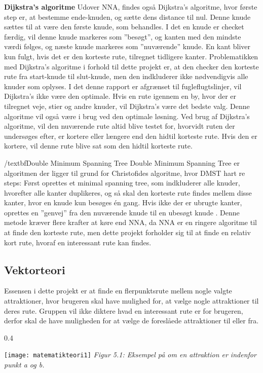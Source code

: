 \textbf{Dijkstra's algoritme}\newline
Udover NNA, findes også Dijkstra’s algoritme, hvor første step er, at bestemme ende-knuden, og sætte dens distance til nul. Denne knude sættes til at være den første knude, som behandles. I det en knude er checket færdig, vil denne knude markeres som ”besøgt”, og kanten med den mindste værdi følges, og næste knude markeres som ”nuværende” knude. En kant bliver kun fulgt, hvis det er den korteste rute, tilregnet tidligere kanter.
Problematikken med Dijkstra’s algoritme i forhold til dette projekt er, at den checker den korteste rute fra start-knude til slut-knude, men den indkluderer ikke nødvendigvis alle knuder som oplyses. I det denne rapport er afgrænset til fugleflugtslinjer, vil Dijkstra’s ikke være den optimale. Hvis en rute igennem en by, hvor der er tilregnet veje, stier og andre knuder, vil Dijkstra’s være det bedste valg. Denne algoritme vil også være i brug ved den optimale løsning. Ved brug af Dijkstra’s algoritme, vil den nuværende rute altid blive testet for, hvorvidt ruten der undersøges efter, er kortere eller længere end den hidtil korteste rute. Hvis den er kortere, vil denne rute blive sat som den hidtil korteste rute. \citep{Dijkstra}

/textbf{Double Minimum Spanning Tree}
Double Minimum Spanning Tree er algoritmen der ligger til grund for Christofides algoritme, hvor DMST hart re steps: Først oprettes et minimal spanning tree, som indkluderer alle knuder, hvorefter alle kanter duplikeres, og så skal den korteste rute findes mellem disse kanter, hvor en knude kun besøges én gang. Hvis ikke der er ubrugte kanter, oprettes en ”genvej” fra den nuværende knude til en ubesøgt knude \citep{DMST}. Denne metode kræver flere krafter at køre end NNA, da NNA er en ringere algoritme til at finde den korteste rute, men dette projekt forholder sig til at finde en relativ kort rute, hvoraf en interessant rute kan findes.


\subsection{Vektorteori}
Essensen i dette projekt er at finde en flerpunktsrute mellem nogle valgte attraktioner, hvor brugeren skal have mulighed for, at vælge nogle attraktioner til deres rute. Gruppen vil ikke diktere hvad en interessant rute er for brugeren, derfor skal de have muligheden for at vælge de foreslåede attraktioner til eller fra.

\begin{wrapfigure}{}{0.4\textwidth}
  \vspace{-10pt}
  \begin{center}
    \texttt{[image: matematikteori1]} \newline
    \textit{Figur 5.1: Eksempel på om en attraktion er indenfor punkt a og b.}\newline
  \end{center}
  \vspace{-20pt}
\end{wrapfigure}
 
